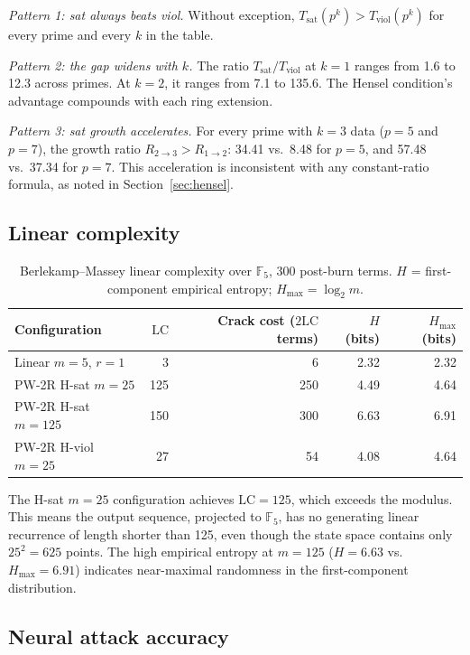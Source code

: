 \documentclass[11pt]{article}
\theoremstyle{plain}
\theoremstyle{definition}
\newcommand{\F}{\mathbb{F}}
\newcommand{\LC}{\mathrm{LC}}
\begin{document}
\emph{Pattern 1: sat always beats viol.} Without exception, $T_{\mathrm{sat}}(p^k) > T_{\mathrm{viol}}(p^k)$ for every prime and every $k$ in the table.

\emph{Pattern 2: the gap widens with $k$.} The ratio $T_{\mathrm{sat}}/T_{\mathrm{viol}}$ at $k=1$ ranges from 1.6 to 12.3 across primes. At $k=2$, it ranges from 7.1 to 135.6. The Hensel condition's advantage compounds with each ring extension.

\emph{Pattern 3: sat growth accelerates.} For every prime with $k=3$ data ($p=5$ and $p=7$), the growth ratio $R_{2\to3} > R_{1\to2}$: 34.41 vs.\ 8.48 for $p=5$, and 57.48 vs.\ 37.34 for $p=7$. This acceleration is inconsistent with any constant-ratio formula, as noted in Section~\ref{sec:hensel}.

\subsection{Linear complexity}
\label{sec:results:lc}

\begin{table}[ht]
\centering
\caption{Berlekamp--Massey linear complexity over $\F_5$, 300 post-burn terms. $H$ = first-component empirical entropy; $H_{\max} = \log_2 m$.}
\label{tab:lc}
\medskip
\begin{tabular}{@{}lrrrr@{}}
\toprule
Configuration & $\LC$ & Crack cost ($2\LC$ terms) & $H$ (bits) & $H_{\max}$ (bits)\\
\midrule
Linear $m=5$, $r=1$          & 3   & 6    & 2.32 & 2.32\\
PW-2R H-sat $m=25$           & 125 & 250  & 4.49 & 4.64\\
PW-2R H-sat $m=125$          & 150 & 300  & 6.63 & 6.91\\
PW-2R H-viol $m=25$          & 27  & 54   & 4.08 & 4.64\\
\bottomrule
\end{tabular}
\end{table}

The H-sat $m=25$ configuration achieves $\LC = 125$, which exceeds the modulus. This means the output sequence, projected to $\F_5$, has no generating linear recurrence of length shorter than 125, even though the state space contains only $25^2 = 625$ points. The high empirical entropy at $m=125$ ($H = 6.63$ vs.\ $H_{\max} = 6.91$) indicates near-maximal randomness in the first-component distribution.

\subsection{Neural attack accuracy}
\label{sec:results:neural}
\end{document}
